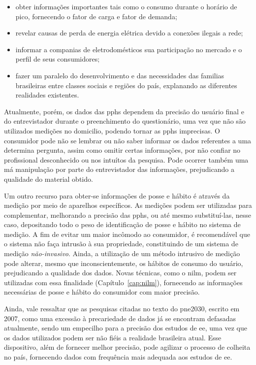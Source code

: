 \begin{itemize}
\item obter informações importantes tais como o consumo durante o horário de pico,
fornecendo o fator de carga e fator de demanda;
\item revelar causas de perda de energia elétrica devido a conexões ilegais a
rede;
\item informar a companias de eletrodomésticos sua participação no mercado e 
o perfil de seus consumidores;
\item fazer um paralelo do desenvolvimento e das necessidades das familias 
brasileiras entre classes sociais e regiões do país, explanando as 
diferentes realidades existentes.
\end{itemize}

Atualmente, porém, os dados das \glspl{pph} dependem da precisão do
usuário final e do entrevistador durante o preenchimento do
questionário, uma vez que não são utilizados medições no domicilio,
podendo tornar as \glspl{pph} imprecisas. O consumidor pode não se
lembrar ou não saber informar os dados referentes a uma determina
pergunta, assim como omitir certas informações, por não confiar no
profissional desconhecido ou nos intuítos da pesquisa.  Pode ocorrer
também uma má manipulação por parte do entrevistador das informações,
prejudicando a qualidade do material obtido.

Um outro recurso para obter-se informações de posse e hábito é através
da medição por meio de aparelhos específicos. As medições podem ser
utilizadas para complementar, melhorando a precisão das \glspl{pph},
ou até mesmo substituí-las, nesse caso, depositando todo o peso de
identificação de posse e hábito no sistema de medição. A fim de evitar
um maior incômodo ao consumidor, é recomendável que o sistema não faça
intrusão à sua propriedade, constituindo de um sistema de medição
\emph{não-invasivo}. Ainda, a utilização de um método intrusivo de
medição pode alterar, mesmo que inconscientemente, os hábitos de
consumo do usuário, prejudicando a qualidade dos dados.  Novas
técnicas, como o \gls{nilm}, podem ser utilizadas com essa
finalidade (Capítulo~\ref{cap:nilm}), fornecendo as informações
necessárias de posse e hábito do consumidor com maior precisão. 

Ainda, vale ressaltar que as pesquisas citadas no texto do
\gls{pne2030}, escrito em 2007, como uma excessão à precariedade de
dados já se encontram defasadas atualmente, sendo um empecilho para a 
precisão dos estudos de \gls{ee}, uma vez que os dados utilizados
podem ser não fiéis a realidade brasileira atual.  Esse dispositivo,
além de fornecer melhor precisão, pode agilizar o processo de colheita
no país, fornecendo dados com frequência mais adequada aos estudos de
\gls{ee}. 
